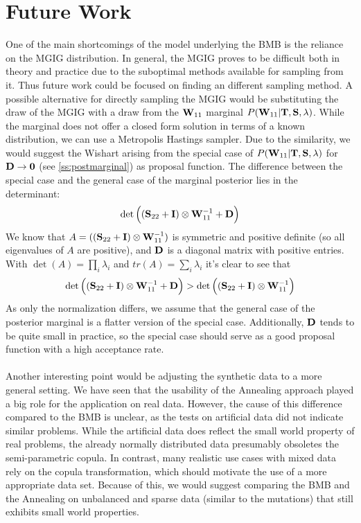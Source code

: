 \section*{Future Work}
One of the main shortcomings of the model underlying the BMB is the reliance on the MGIG distribution.
In general, the MGIG proves to be difficult both in theory and practice due to the suboptimal methods available for sampling from it.
Thus future work could be focused on finding an different sampling method.
A possible alternative for directly sampling the MGIG would be substituting the draw of the MGIG with a draw from the $\mathbf{W}_{11}$ marginal $P(\mathbf{W}_{11}|\mathbf{T}, \mathbf{S}, \lambda)$.
While the marginal does not offer a closed form solution in terms of a known distribution, we can use a Metropolis Hastings sampler.
Due to the similarity, we would suggest the Wishart arising from the special case of $P(\mathbf{W}_{11}|\mathbf{T}, \mathbf{S}, \lambda)$ for $\mathbf{D}\rightarrow\mathbf{0}$ (see \autoref{ss:postmarginal}) as proposal function.
The difference between the special case and the general case of the marginal posterior lies in the determinant:
$$\det
\Big(
(\mathbf{S}_{22} + \mathbf{I}) \otimes \mathbf{W}_{11}^{-1} +\mathbf{D}
\Big)$$
We know that $A=((\mathbf{S}_{22} + \mathbf{I}) \otimes \mathbf{W}_{11}^{-1})$ is symmetric and positive definite (so all eigenvalues of $A$ are positive), and $\mathbf{D}$ is a diagonal matrix with positive entries.
With $\det(A)=\prod_{i}\lambda_i$ and $tr(A) = \sum_i \lambda_i$ it's clear to see
that
$$\det\Big((\mathbf{S}_{22} + \mathbf{I}) \otimes \mathbf{W}_{11}^{-1} + \mathbf{D}\Big) > \det\Big((\mathbf{S}_{22} + \mathbf{I}) \otimes \mathbf{W}_{11}^{-1}\Big)
$$
As only the normalization differs, we assume that the general case of the posterior marginal is a flatter version of the special case.
Additionally, $\mathbf{D}$ tends to be quite small in practice, so the special case should serve as a good proposal function with a high acceptance rate.
\\\\
Another interesting point would be adjusting the synthetic data to a more general setting.
We have seen that the usability of the Annealing approach played a big role for the application on real data.
However, the cause of this difference compared to the BMB is unclear, as the tests on artificial data did not indicate similar problems.
While the artificial data does reflect the small world property of real problems, the already normally distributed data presumably obsoletes the semi-parametric copula.
In contrast, many realistic use cases with mixed data rely on the copula transformation,
which should motivate the use of a more appropriate data set.
Because of this, we would suggest comparing the BMB and the Annealing on unbalanced and sparse data (similar to the mutations) that still exhibits small world properties.
